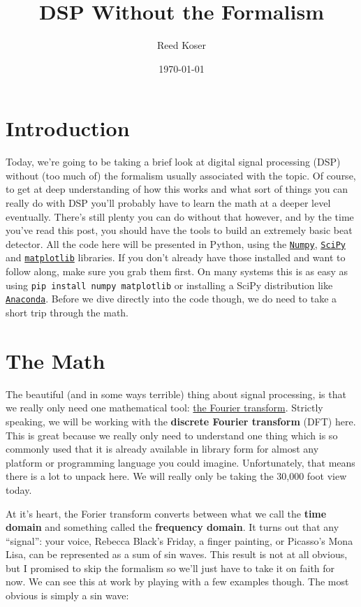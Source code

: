 \documentclass[12pt]{article}
\title{DSP Without the Formalism}
\author{Reed Koser}
\date{\today}
\begin{document}
\maketitle{}

\section{Introduction}
Today,
we're going to be
taking a brief look at
digital signal processing (DSP)
without (too much of)
the formalism usually associated with the topic.
Of course,
to get at deep understanding of how this works
and what sort of things you can really do with DSP
you'll probably have to learn the math
at a deeper level eventually.
There's still plenty you can do
without that however,
and by the time you've read this post,
you should have the tools
to build an extremely basic
beat detector.
All the code here will be presented in
Python,
using the
\href{http://www.numpy.org/}{\texttt{Numpy}},
\href{https://scipython.com/}{\texttt{SciPy}}
and 
\href{https://matplotlib.org/}{\texttt{matplotlib}}
libraries.
If you don't already have those installed
and want to follow along,
make sure you grab them first.
On many systems this is as easy as
using \texttt{pip install numpy matplotlib}
or installing a SciPy distribution like
\href{https://www.anaconda.com/download/}{\texttt{Anaconda}}.
Before we dive
directly into the code though,
we do need to take a short trip through the math.

\section{The Math}
The beautiful (and in some ways terrible)
thing about signal processing,
is that we really only need one mathematical tool:
\href{https://en.wikipedia.org/wiki/Fourier_transform}{the Fourier transform}.
Strictly speaking,
we will be working with the \textbf{discrete Fourier transform} (DFT)
here.
This is great because we really only need to understand
one thing which is so commonly used that it is
already available in library form for
almost any platform or programming language
you could imagine.
Unfortunately,
that means there is a lot to unpack here.
We will really only be taking the 30,000 foot view today.

At it's heart,
the Forier transform
converts between what we call the
\textbf{time domain} and something called the \textbf{frequency domain}.
It turns out that any ``signal'':
your voice, Rebecca Black's Friday,
a finger painting, or Picasso's Mona Lisa,
can be represented as a sum of sin waves.
This result is not at all obvious,
but I promised to skip the formalism
so we'll just have to take it on faith for now.
We can see this at work by playing with a few examples though.
The most obvious is simply a sin wave:
\end{document}
